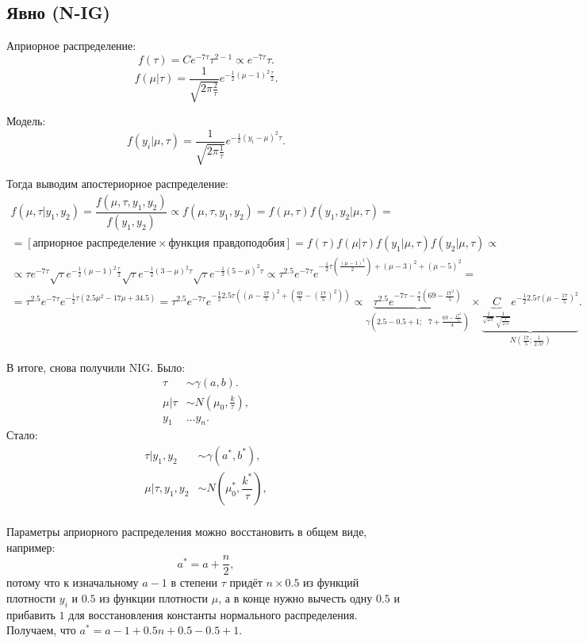 \documentclass[10pt, a4paper]{extarticle}
\begin{document}
\subsection{Явно (N-IG)}

Априорное распределение:
\[
f(\tau) = Ce^{-7\tau}\tau^{2-1} \propto e^{-7\tau}\tau.
\]
\[
f(\mu | \tau) = \dfrac{1}{\sqrt{2\pi\frac{2}{\tau}}}e^{-\frac{1}{2}(\mu - 1)^2\frac{\tau}{2}}.
\]

Модель:
\[
f(y_i | \mu, \tau) = \dfrac{1}{\sqrt{2\pi \frac{1}{\tau}}}e^{-\frac{1}{2}(y_i - \mu)^2\tau}.
\]

Тогда выводим апостериорное распределение:
\begin{align*}
	f(\mu, \tau | y_1, y_2) = \dfrac{f(\mu, \tau, y_1, y_2)}{f(y_1, y_2)} \propto f(\mu, \tau, y_1, y_2) = f(\mu, \tau)f(y_1, y_2|\mu, \tau) =\\= [\text{априорное распределение}\times\text{функция правдоподобия}] = f(\tau)f(\mu|\tau)f(y_1|\mu, \tau)f(y_2|\mu, \tau) \propto \\ \propto
	\tau e^{-7\tau}\sqrt{\tau}e^{-\frac{1}{2}(\mu - 1)^2\frac{\tau}{2}}\sqrt{\tau}e^{-\frac{1}{2}(3 - \mu)^2\tau}\sqrt{\tau}e^{-\frac{1}{2}(5 - \mu)^2\tau} \propto \tau^{2.5}e^{-7\tau} e^{-\frac{1}{2}\tau (\frac{(\mu-1)^2}{2})+(\mu-3)^2+(\mu-5)^2} = \\ =
	\tau^{2.5}e^{-7\tau}e^{-\frac{1}{2}\tau(2.5\mu^2 - 17\mu + 34.5)} = \tau^{2.5}e^{-7\tau}e^{-\frac{1}{2}2.5\tau((\mu - \frac{17}{5})^2 + (\frac{69}{5}-(\frac{17}{5})^2))} \propto \underbrace{\tau^{2.5}e^{-7\tau-\frac{\tau}{4}(69 - \frac{17^2}{5})}}_{\gamma(2.5-0.5+1;\text{ } 7 + \frac{69 - \frac{17^2}{5}}{4})} \times \underbrace{\underbrace{C}_{\frac{1}{\sqrt{2\pi}}\frac{1}{\sqrt{\frac{1}{2.5\tau}}}}e^{-\frac{1}{2}2.5\tau(\mu - \frac{17}{5})^2}}_{N(\frac{17}{5}; \frac{1}{2.5\tau})}.
\end{align*}

В итоге, снова получили NIG. Было: 
\begin{align*}
	\tau &\sim \gamma(a, b). \\
	\mu | \tau &\sim N(\mu_0, \frac{k}{\tau}), \\
	y_1 &\dots y_n.
\end{align*}
Стало:
\begin{align*}
	\tau | y_1, y_2 &\sim \gamma(a^*, b^*), \\
	\mu | \tau, y_1, y_2 &\sim N(\mu_0^*, \dfrac{k^*}{\tau}), \\
\end{align*}

Параметры априорного распределения можно восстановить в общем виде, например:
\[
a^* = a + \dfrac{n}{2},
\]
потому что к изначальному $a-1$ в степени $\tau$ придёт $n\times 0.5$ из функций плотности $y_i$ и $0.5$ из функции плотности $\mu$, а в конце нужно вычесть одну $0.5$ и прибавить $1$ для восстановления константы нормального распределения. Получаем, что $a^* = a - 1 + 0.5n + 0.5 - 0.5 + 1$.
\end{document}
